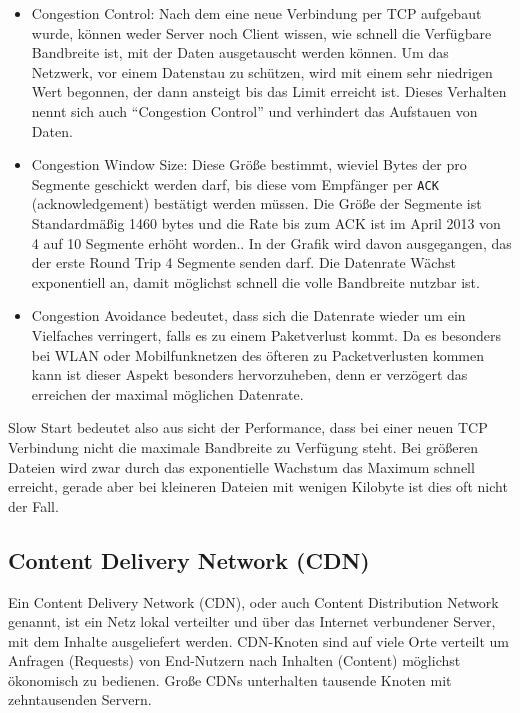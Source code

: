 		\begin{itemize}
			\item Congestion Control: Nach dem eine neue Verbindung per TCP aufgebaut wurde, können weder Server noch Client wissen, wie schnell die Verfügbare Bandbreite ist, mit der Daten ausgetauscht werden können. Um das Netzwerk, vor einem Datenstau zu schützen, wird mit einem sehr niedrigen Wert begonnen, der dann ansteigt bis das Limit erreicht ist. Dieses Verhalten nennt sich auch "`Congestion Control"' und verhindert das Aufstauen von Daten.
			\item Congestion Window Size: Diese Größe bestimmt, wieviel Bytes der pro Segmente geschickt werden darf, bis diese vom Empfänger per \texttt{ACK} (acknowledgement) bestätigt werden müssen. Die Größe der Segmente ist Standardmäßig 1460 bytes und die Rate bis zum ACK ist im April 2013 von 4 auf 10 Segmente erhöht worden.\autocite{grigorikSlowStart}. In der Grafik wird davon ausgegangen, das der erste Round Trip 4 Segmente senden darf. Die Datenrate Wächst exponentiell an, damit möglichst schnell die volle Bandbreite nutzbar ist.\\
			\item Congestion Avoidance bedeutet, dass sich die Datenrate wieder um ein Vielfaches verringert, falls es zu einem Paketverlust kommt. Da es besonders bei WLAN oder Mobilfunknetzen des öfteren zu Packetverlusten kommen kann ist dieser Aspekt besonders hervorzuheben, denn er verzögert das erreichen der maximal möglichen Datenrate.
		\end{itemize}

		Slow Start bedeutet also aus sicht der Performance, dass bei einer neuen TCP Verbindung nicht die maximale Bandbreite zu Verfügung steht. Bei größeren Dateien wird zwar durch das exponentielle Wachstum das Maximum schnell erreicht, gerade aber bei kleineren Dateien mit wenigen Kilobyte ist dies oft nicht der Fall.



	\subsection{Content Delivery Network (CDN)} %
	\label{sub:content_delivery_network}
		Ein Content Delivery Network (CDN), oder auch Content Distribution Network genannt, ist ein Netz lokal verteilter und über das Internet verbundener Server, mit dem Inhalte ausgeliefert werden. CDN-Knoten sind auf viele Orte verteilt um Anfragen (Requests) von End-Nutzern nach Inhalten (Content) möglichst ökonomisch zu bedienen. Große CDNs unterhalten tausende Knoten mit zehntausenden Servern.\autocite{wikipediaCDN}

